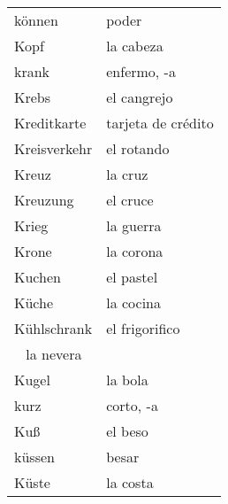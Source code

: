 \begin{longtable}{p{} p{}}
können & poder\\
Kopf & la cabeza\\
krank & enfermo, -a\\
Krebs & el cangrejo\\
Kreditkarte & tarjeta de crédito\\
Kreisverkehr & el rotando\\
Kreuz & la cruz\\
Kreuzung & el cruce\\
Krieg & la guerra\\
Krone & la corona\\
Kuchen & el pastel\\
Küche & la cocina\\
Kühlschrank & el frigorifico\\
~ la nevera\\
Kugel & la bola\\
kurz & corto, -a\\
Kuß & el beso\\
küssen & besar\\
Küste & la costa\\
\end{longtable}
